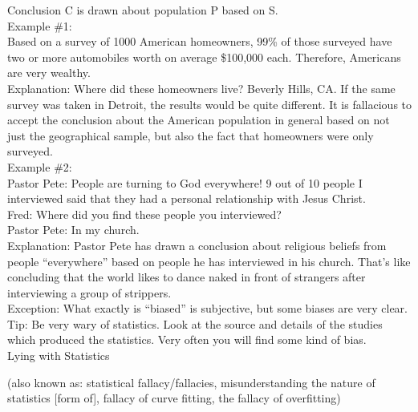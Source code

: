 \documentclass[a4paper,12pt,single,pdftex]{scrbook}
\begin{document}
    
      Conclusion C is drawn about population P based on S.
    \\

    
      Example \#1:
    \\

    
      Based on a survey of 1000 American homeowners, 99\% of those surveyed have two or more automobiles worth on average \$100,000 each.  Therefore, Americans are very wealthy.
    \\

    
      Explanation: Where did these homeowners live?  Beverly Hills, CA.  If the same survey was taken in Detroit, the results would be quite different.  It is fallacious to accept the conclusion about the American population in general based on not just the geographical sample, but also the fact that homeowners were only surveyed.
    \\

    
      Example \#2:
    \\

    
      Pastor Pete: People are turning to God everywhere!  9 out of 10 people I interviewed said that they had a personal relationship with Jesus Christ.
    \\

    
      Fred: Where did you find these people you interviewed?
    \\

    
      Pastor Pete: In my church.
    \\

    
      Explanation: Pastor Pete has drawn a conclusion about religious beliefs from people “everywhere” based on people he has interviewed in his church.  That’s like concluding that the world likes to dance naked in front of strangers after interviewing a group of strippers.
    \\

    
      Exception: What exactly is “biased” is subjective, but some biases are very clear.
    \\

    
      Tip: Be very wary of statistics.  Look at the source and details of the studies which produced the statistics.  Very often you will find some kind of bias.
    \\

  

Lying with Statistics
    
      (also known as: statistical fallacy/fallacies, misunderstanding the nature of statistics [form of], fallacy of curve fitting, the fallacy of overfitting)
    \\
\end{document}
